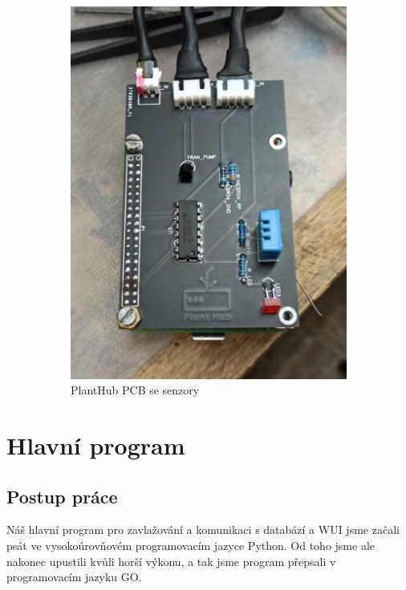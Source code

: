 \documentclass[12pt,a4paper]{article}
\begin{document}
\begin{figure}[h]
\begin{subfigure}[b]{0.4\linewidth}
		\includegraphics[width=\linewidth]{planthub.png}
		\caption{PlantHub PCB se senzory}
	\end{subfigure}
	\caption{}
\end{figure}

\clearpage

\section{Hlavní program}

\subsection{Postup práce}

Náš hlavní program pro zavlažování a komunikaci s databází a WUI
jsme začali psát ve vysokoúrovňovém programovacím jazyce Python. Od toho jsme
ale nakonec upustili kvůli horší výkonu, a tak jsme program přepsali v programovacím jazyku GO.
\end{document}
